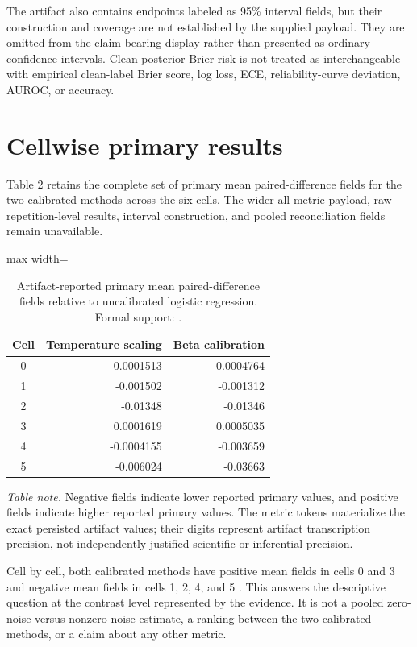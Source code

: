 \documentclass{article}
\begin{document}
The artifact also contains endpoints labeled as 95\% interval fields, but their construction and coverage are not established by the supplied payload. They are omitted from the claim-bearing display rather than presented as ordinary confidence intervals. Clean-posterior Brier risk is not treated as interchangeable with empirical clean-label Brier score, log loss, ECE, reliability-curve deviation, AUROC, or accuracy.

\section{Cellwise primary results}
Table 2 retains the complete set of primary mean paired-difference fields for the two calibrated methods across the six cells. The wider all-metric payload, raw repetition-level results, interval construction, and pooled reconciliation fields remain unavailable.

\begin{table}[ht]
\centering
\caption{Artifact-reported primary mean paired-difference fields relative to uncalibrated logistic regression. Formal support: \cite{exec}.}
\begin{adjustbox}{max width=\linewidth}
\begin{tabular}{crr}
\toprule
Cell & Temperature scaling & Beta calibration\\
\midrule
0 & 0.0001513 & 0.0004764\\
1 & -0.001502 & -0.001312\\
2 & -0.01348 & -0.01346\\
3 & 0.0001619 & 0.0005035\\
4 & -0.0004155 & -0.003659\\
5 & -0.006024 & -0.03663\\
\bottomrule
\end{tabular}
\end{adjustbox}
\end{table}

\noindent\textit{Table note.} Negative fields indicate lower reported primary values, and positive fields indicate higher reported primary values. The metric tokens materialize the exact persisted artifact values; their digits represent artifact transcription precision, not independently justified scientific or inferential precision.

Cell by cell, both calibrated methods have positive mean fields in cells 0 and 3 and negative mean fields in cells 1, 2, 4, and 5 \cite{exec}. This answers the descriptive question at the contrast level represented by the evidence. It is not a pooled zero-noise versus nonzero-noise estimate, a ranking between the two calibrated methods, or a claim about any other metric.
\end{document}
